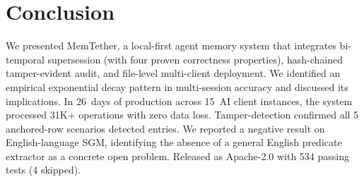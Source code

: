 \documentclass{article}
\begin{document}
\section{Conclusion}
We presented MemTether, a local-first agent memory system that integrates bi-temporal supersession (with four proven correctness properties), hash-chained tamper-evident audit, and file-level multi-client deployment. We identified an empirical exponential decay pattern in multi-session accuracy and discussed its implications. In 26~days of production across 15~AI client instances, the system processed 31K+ operations with zero data loss. Tamper-detection confirmed all 5 anchored-row scenarios detected entries. We reported a negative result on English-language SGM, identifying the absence of a general English predicate extractor as a concrete open problem. Released as Apache-2.0 with 534 passing tests (4 skipped).
\end{document}
